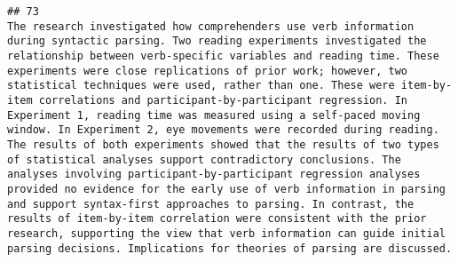 \documentclass[
  english,
  man]{apa6}
\begin{document}
\begin{verbatim}
## 73                                                                                                                                                                                                                                                                                                                                                                                                                                                                                                                                                                                                                                                                                                                                                                                                                                                                                                                                                                                                                                                                                                                                                                                                                                                                                                                                                                                                                                                                                                                                                        The research investigated how comprehenders use verb information during syntactic parsing. Two reading experiments investigated the relationship between verb-specific variables and reading time. These experiments were close replications of prior work; however, two statistical techniques were used, rather than one. These were item-by-item correlations and participant-by-participant regression. In Experiment 1, reading time was measured using a self-paced moving window. In Experiment 2, eye movements were recorded during reading. The results of both experiments showed that the results of two types of statistical analyses support contradictory conclusions. The analyses involving participant-by-participant regression analyses provided no evidence for the early use of verb information in parsing and support syntax-first approaches to parsing. In contrast, the results of item-by-item correlation were consistent with the prior research, supporting the view that verb information can guide initial parsing decisions. Implications for theories of parsing are discussed.

\end{verbatim}
\end{document}
